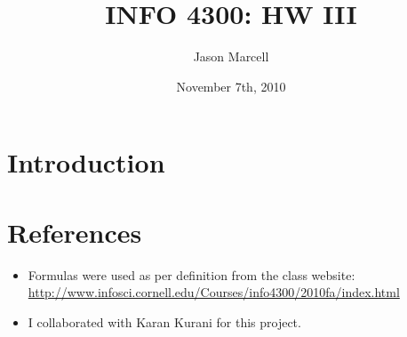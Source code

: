 \documentclass[12pt]{article}
\title{INFO 4300: HW III}
\author{Jason Marcell}
\date{November 7th, 2010}
\begin{document}
 
\maketitle 
\newpage
\section{Introduction} %
\label{sec:introduction}
\section{References} %
\label{sec:references}
\begin{itemize}
  \item Formulas were used as per definition from the class website: \url{http://www.infosci.cornell.edu/Courses/info4300/2010fa/index.html}
  \item I collaborated with Karan Kurani for this project.
\end{itemize}
\end{document}
